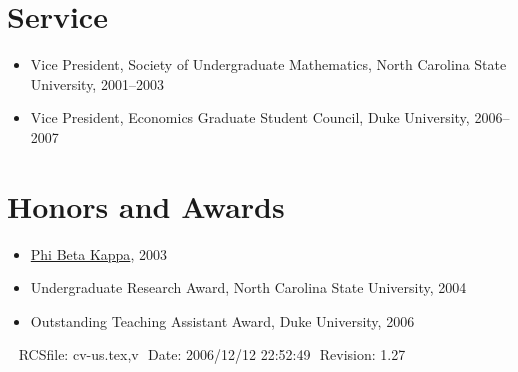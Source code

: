 \documentclass[overlapped,line,letterpaper]{res}
\begin{document}
\begin{resume}

%


\section{\bf Service}

\begin{itemize}
\item Vice President, Society of Undergraduate Mathematics, North
  Carolina State University, 2001--2003
\item Vice President, Economics Graduate Student Council, Duke
  University, 2006--2007
\end{itemize}


\section{\bf Honors and Awards}
\begin{itemize}
\item \href{http://www.pbk.org/}{Phi Beta Kappa}, 2003
\item Undergraduate Research Award, North Carolina State University, 2004
\item Outstanding Teaching Assistant Award, Duke University, 2006
\end{itemize}


\begin{center}
\vspace{\fill}\ \newline
{\tiny \rm $ $RCSfile: cv-us.tex,v $ $ }
{\tiny \rm $ $Date: 2006/12/12 22:52:49 $ $ }
{\tiny \rm $ $Revision: 1.27 $ $ }
\end{center}

\end{resume}
\end{document}
